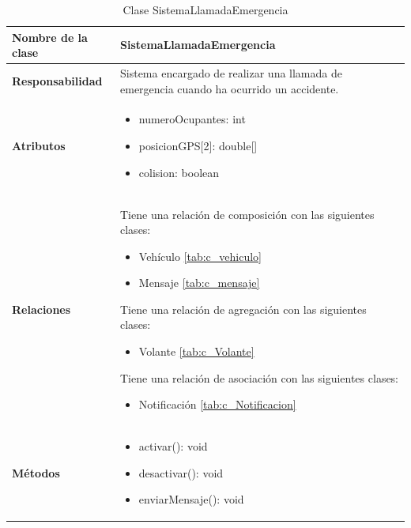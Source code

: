 \begin{table}[h]
\begin{center}
\begin{tabular}{p{} p{11cm}}
\textbf{Nombre de la clase} &  SistemaLlamadaEmergencia\\ \hline \hline
\textbf{Responsabilidad} &  Sistema encargado de realizar una llamada de emergencia cuando ha ocurrido un accidente.  \\ \hline
\textbf{Atributos} & \begin{itemize}
                      \item numeroOcupantes: int
                      \item posicionGPS[2]: double[]
                      \item colision: boolean
                    \end{itemize}\\ \hline
\textbf{Relaciones} & \par Tiene una relación de composición con las siguientes clases:
                      \begin{itemize}
                        \item Vehículo \ref{tab:c_vehiculo}
                        \item Mensaje \ref{tab:c_mensaje}
                      \end{itemize}

                      \par Tiene una relación de agregación con las siguientes clases:
                      \begin{itemize}
                        \item Volante \ref{tab:c_Volante}
                      \end{itemize}

                      \par Tiene una relación de asociación con las siguientes clases:
                      \begin{itemize}
                        \item Notificación \ref{tab:c_Notificacion}
                      \end{itemize}


                      \\ \hline

\textbf{Métodos} &  \begin{itemize}
                      \item activar(): void
                      \item desactivar(): void
                      \item enviarMensaje(): void
                    \end{itemize}\\ \hline
\end{tabular}
\caption{Clase SistemaLlamadaEmergencia}
\label{tab:c_SLEmerg}
\end{center}
\end{table}










